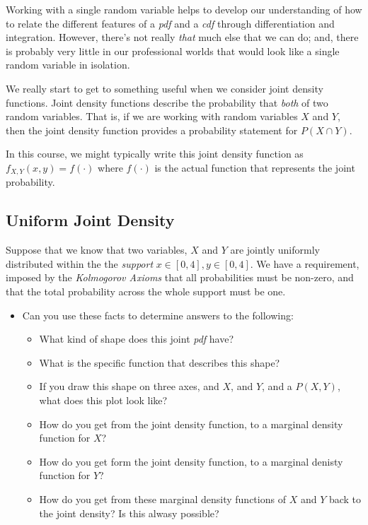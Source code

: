 \documentclass[
]{book}
\providecommand{\tightlist}{%
  \setlength{\itemsep}{0pt}\setlength{\parskip}{0pt}}
\theoremstyle{definition}
\theoremstyle{definition}
\theoremstyle{definition}
\theoremstyle{definition}
\theoremstyle{remark}
\begin{document}
Working with a single random variable helps to develop our understanding of how to relate the different features of a \emph{pdf} and a \emph{cdf} through differentiation and integration. However, there's not really \emph{that} much else that we can do; and, there is probably very little in our professional worlds that would look like a single random variable in isolation.

We really start to get to something useful when we consider joint density functions. Joint density functions describe the probability that \emph{both} of two random variables. That is, if we are working with random variables \(X\) and \(Y\), then the joint density function provides a probability statement for \(P(X \cap Y)\).

In this course, we might typically write this joint density function as \(f_{X,Y}(x,y) = f(\cdot)\) where \(f(\cdot)\) is the actual function that represents the joint probability.

\hypertarget{uniform-joint-density}{%
\subsection{Uniform Joint Density}\label{uniform-joint-density}}

Suppose that we know that two variables, \(X\) and \(Y\) are jointly uniformly distributed within the the \emph{support} \(x \in [0,4], y \in [0,4]\). We have a requirement, imposed by the \emph{Kolmogorov Axioms} that all probabilities must be non-zero, and that the total probability across the whole support must be one.

\begin{itemize}
\tightlist
\item
  Can you use these facts to determine answers to the following:

  \begin{itemize}
  \tightlist
  \item
    What kind of shape does this joint \emph{pdf} have?
  \item
    What is the specific function that describes this shape?
  \item
    If you draw this shape on three axes, and \(X\), and \(Y\), and a \(P(X,Y)\), what does this plot look like?
  \item
    How do you get from the joint density function, to a marginal density function for \(X\)?
  \item
    How do you get form the joint density function, to a marginal denisty function for \(Y\)?
  \item
    How do you get from these marginal density functions of \(X\) and \(Y\) back to the joint density? Is this alwasy possible?
  \end{itemize}
\end{itemize}
\end{document}
